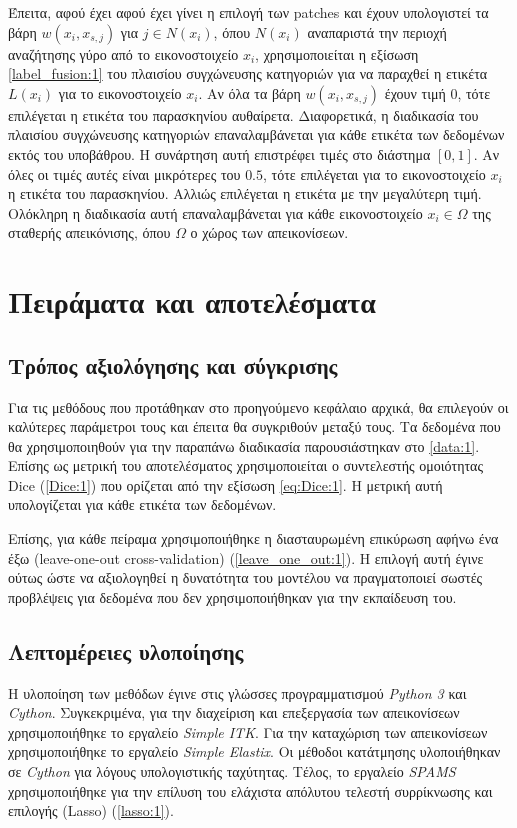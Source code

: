 \documentclass[a4paper,12pt]{article}
\begin{document}
Έπειτα, αφού έχει αφού έχει γίνει η επιλογή των patches και έχουν υπολογιστεί τα
βάρη $w(x_i, x_{s,j})$ για $j \in N(x_i)$, όπου $N(x_i)$ αναπαριστά την περιοχή
αναζήτησης γύρο από το εικονοστοιχείο $x_i$, χρησιμοποιείται η εξίσωση
\eqref{label_fusion:1} του πλαισίου συγχώνευσης κατηγοριών για να παραχθεί η
ετικέτα $L(x_i)$ για το εικονοστοιχείο $x_i$. Αν όλα τα βάρη $w(x_i, x_{s,j})$
έχουν τιμή $0$, τότε επιλέγεται η ετικέτα του παρασκηνίου αυθαίρετα.
Διαφορετικά, η διαδικασία του πλαισίου συγχώνευσης κατηγοριών επαναλαμβάνεται
για κάθε ετικέτα των δεδομένων εκτός του υποβάθρου. Η συνάρτηση αυτή επιστρέφει
τιμές στο διάστημα $[0,1]$. Αν όλες οι τιμές αυτές είναι μικρότερες του $0.5$,
τότε επιλέγεται για το εικονοστοιχείο $x_i$ η ετικέτα του παρασκηνίου. Αλλιώς
επιλέγεται η ετικέτα με την μεγαλύτερη τιμή. Ολόκληρη η διαδικασία αυτή
επαναλαμβάνεται για κάθε εικονοστοιχείο $x_i \in \Omega$ της σταθερής
απεικόνισης, όπου $\Omega$ ο χώρος των απεικονίσεων.


\section{Πειράματα και αποτελέσματα}

\subsection{Τρόπος αξιολόγησης και σύγκρισης}

Για τις μεθόδους που προτάθηκαν στο προηγούμενο κεφάλαιο αρχικά, θα επιλεγούν οι
καλύτερες παράμετροι τους και έπειτα θα συγκριθούν μεταξύ τους. Τα δεδομένα που
θα χρησιμοποιηθούν για την παραπάνω διαδικασία παρουσιάστηκαν στο \ref{data:1}.
Επίσης ως μετρική του αποτελέσματος χρησιμοποιείται ο συντελεστής ομοιότητας
Dice (\ref{Dice:1}) που ορίζεται από την εξίσωση \eqref{eq:Dice:1}. Η μετρική
αυτή υπολογίζεται για κάθε ετικέτα των δεδομένων.

Επίσης, για κάθε πείραμα χρησιμοποιήθηκε η διασταυρωμένη επικύρωση αφήνω ένα έξω
(leave-one-out cross-validation) (\ref{leave_one_out:1}). Η επιλογή αυτή έγινε
ούτως ώστε να αξιολογηθεί η δυνατότητα του μοντέλου να πραγματοποιεί σωστές
προβλέψεις για δεδομένα που δεν χρησιμοποιήθηκαν για την εκπαίδευση του.

\subsection{Λεπτομέρειες υλοποίησης}

Η υλοποίηση των μεθόδων έγινε στις γλώσσες προγραμματισμού \emph{Python 3} και
\emph{Cython}. Συγκεκριμένα, για την διαχείριση και επεξεργασία των
απεικονίσεων χρησιμοποιήθηκε το εργαλείο \emph{Simple ITK}. Για την καταχώριση
των απεικονίσεων χρησιμοποιήθηκε το εργαλείο \emph{Simple Elastix}. Οι μέθοδοι
κατάτμησης υλοποιήθηκαν σε \emph{Cython} για λόγους υπολογιστικής ταχύτητας.
Τέλος, το εργαλείο \emph{SPAMS} χρησιμοποιήθηκε για την επίλυση του ελάχιστα
απόλυτου τελεστή συρρίκνωσης και επιλογής (Lasso) (\ref{lasso:1}).
\end{document}
